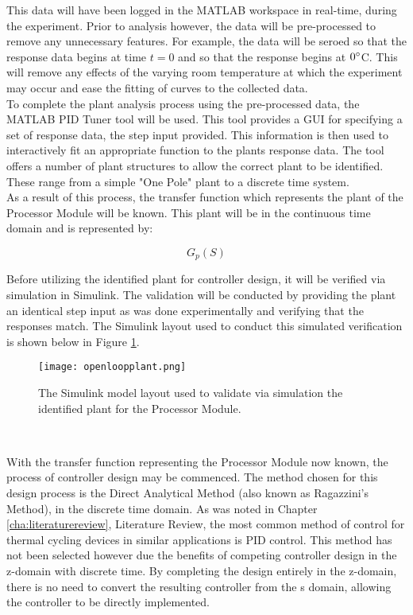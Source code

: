 This data will have been logged in the MATLAB workspace in real-time, during the experiment. Prior to analysis however, the data will be pre-processed to remove any unnecessary features. For example, the data will be seroed so that the response data begins at time $t = 0$ and so that the response begins at $0\degree$C. This will remove any effects of the varying room temperature at which the experiment may occur and ease the fitting of curves to the collected data.\\

To complete the plant analysis process using the pre-processed data, the MATLAB PID Tuner tool will be used. This tool provides a GUI for specifying a set of response data, the step input provided. This information is then used to interactively fit an appropriate function to the plants response data. The tool offers a number of plant structures to allow the correct plant to be identified. These range from a simple "One Pole" plant to a discrete time system.\\

As a result of this process, the transfer function which represents the plant of the Processor Module will be known. This plant will be in the continuous time domain and is represented by:

$$G_p(S)$$

Before utilizing the identified plant for controller design, it will be verified via simulation in Simulink. The validation will be conducted by providing the plant an identical step input as was done experimentally and verifying that the responses match. The Simulink layout used to conduct this simulated verification is shown below in Figure \ref{fig:openloopplant}.\\

\begin{figure}[!htb]
	\centering
	\texttt{[image: openloopplant.png]}
	\caption[Open loop plant valiation Simulink Model.]{The Simulink model layout used to validate via simulation the identified plant for the Processor Module.}
	\label{fig:openloopplant}
\end{figure} 
\FloatBarrier

With the transfer function representing the Processor Module now known, the process of controller design may be commenced. The method chosen for this design process is the Direct Analytical Method (also known as Ragazzini's Method), in the discrete time domain. As was noted in Chapter \ref{cha:literaturereview}, Literature Review, the most common method of control for thermal cycling devices in similar applications is PID control. This method has not been selected however due the benefits of competing controller design in the z-domain with discrete time. By completing the design entirely in the z-domain, there is no need to convert the resulting controller from the s domain, allowing the controller to be directly implemented.\\


